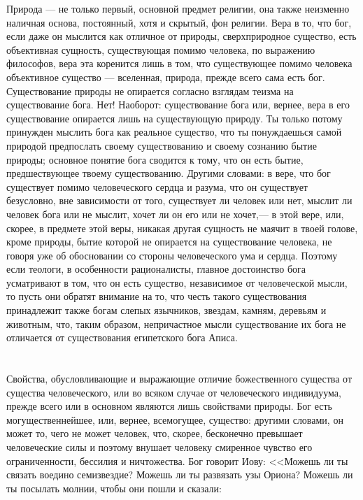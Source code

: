 \documentclass[12pt]{article}
\begin{document}
Природа --- не только первый, основной предмет религии, она также неизменно наличная основа, постоянный, хотя и скрытый, фон религии. Вера в то, что бог, если даже он мыслится как отличное от природы, сверхприродное существо, есть объективная сущность, существующая помимо человека, по выражению философов, вера эта коренится лишь в том, что существующее помимо человека объективное существо --- вселенная, природа, прежде всего сама есть бог. Существование природы не опирается согласно взглядам теизма на существование бога. Нет! Наоборот: существование бога или, вернее, вера в его существование опирается лишь на существующую природу. Ты только потому принужден мыслить бога как реальное существо, что ты понуждаешься самой природой предпослать своему существованию и своему сознанию бытие природы; основное понятие бога сводится к тому, что он есть бытие, предшествующее твоему существованию. Другими словами: в вере, что бог существует помимо человеческого сердца и разума, что он существует безусловно, вне зависимости от того, существует ли человек или нет, мыслит ли человек бога или не мыслит, хочет ли он его или не хочет,--- в этой вере, или, скорее, в предмете этой веры, никакая другая сущность не маячит в твоей голове, кроме природы, бытие которой не опирается на существование человека, не говоря уже об обосновании со стороны человеческого ума и сердца. Поэтому если теологи, в особенности рационалисты, главное достоинство бога усматривают в том, что он есть существо, независимое от человеческой мысли, то пусть они обратят внимание на то, что честь такого существования принадлежит также богам слепых язычников, звездам, камням, деревьям и животным, что, таким образом, непричастное мысли существование их бога не отличается от существования египетского бога Аписа.



\section{}

Свойства, обусловливающие и выражающие отличие божественного существа от существа человеческого, или во всяком случае от человеческого индивидуума, прежде всего или в основном являются лишь свойствами природы. Бог есть могущественнейшее, или, вернее, всемогущее, существо: другими словами, он может то, чего не может человек, что, скорее, бесконечно превышает человеческие силы и поэтому внушает человеку смиренное чувство его ограниченности, бессилия и ничтожества. Бог говорит Иову: <<Можешь ли ты связать воедино семизвездие? Можешь ли ты развязать узы Ориона? Можешь ли ты посылать молнии, чтобы они пошли и сказали:
\end{document}
